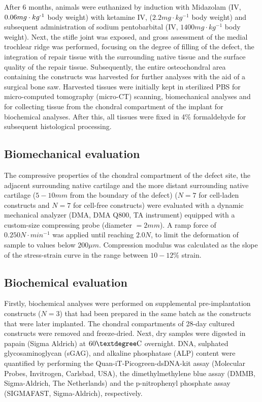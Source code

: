 \documentclass[twocolumn, empirical, authordate, issue]{jote-new-article}
\begin{document}
After 6 months, animals were euthanized by induction with Midazolam (IV, $0.06mg\cdot kg\textsuperscript{-1}$ body weight) with ketamine IV, ($ 2.2 mg\cdot kg^{-1} $ body weight) and subsequent administration of sodium pentobarbital (IV, $ 1400 mg\cdot kg^{-1} $ body weight). Next, the stifle joint was exposed, and gross assessment of the medial trochlear ridge was performed, focusing on the degree of filling of the defect, the integration of repair tissue with the surrounding native tissue and the surface quality of the repair tissue. Subsequently, the entire osteochondral area containing the constructs was harvested for further analyses with the aid of a surgical bone saw. Harvested tissues were initially kept in sterilized PBS for micro-computed tomography (micro-CT) scanning, biomechanical analyses and for collecting tissue from the chondral compartment of the implant for biochemical analyses. After this, all tissues were fixed in 4\% formaldehyde for subsequent histological processing.

\subsection{Biomechanical evaluation} 

The compressive properties of the chondral compartment of the defect site, the adjacent surrounding native cartilage and the more distant surrounding native cartilage ($5 - 10 mm$ from the boundary of the defect) ($N=7$ for cell-laden constructs and $N=7$ for cell-free constructs) were evaluated with a dynamic mechanical analyzer (DMA, DMA Q800, TA instrument) equipped with a custom-size compressing probe (diameter $= 2 mm$). A ramp force of $ 0.250 N\cdot min^{-1} $ was applied until reaching $2.0 N$, to limit the deformation of sample to values below $200 \mu m$. Compression modulus was calculated as the slope of the stress-strain curve in the range between $10-12 \%$ strain.

\subsection{Biochemical evaluation} 

Firstly, biochemical analyses were performed on supplemental pre-implantation constructs ($ N=3 $) that had been prepared in the same batch as the constructs that were later implanted. The chondral compartments of 28-day cultured constructs were removed and freeze-dried. Next, dry samples were digested in papain (Sigma Aldrich) at $60\textdegree \text{C}$ overnight. DNA, sulphated glycosaminoglycan (sGAG), and alkaline phosphatase (ALP) content were quantified by performing the Quan-iT-Picogreen-dsDNA-kit assay (Molecular Probes, Invitrogen, Carlsbad, USA), the dimethylmethylene blue assay (DMMB, Sigma-Aldrich, The Netherlands) and the p-nitrophenyl phosphate assay (SIGMAFAST\texttrademark, Sigma-Aldrich), respectively.
\end{document}
